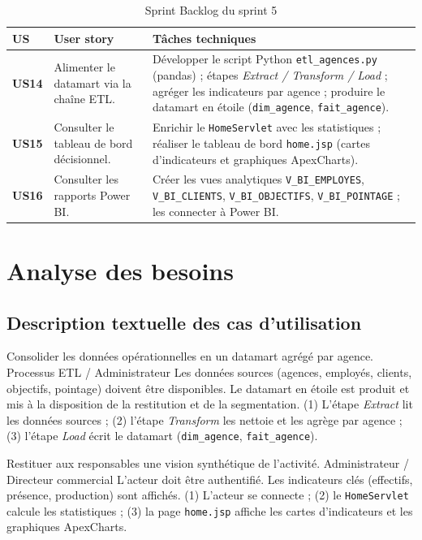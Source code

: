 \begin{table}[htbp]
\centering
\caption{Sprint Backlog du sprint 5}
\label{tab:bl_s5}
\renewcommand{\arraystretch}{1.3}
\begin{tabularx}{\textwidth}{>{\bfseries}p{1cm}p{5cm}X}
\toprule
\textmd{\textbf{US}} & \textbf{User story} & \textbf{Tâches techniques}\\
\midrule
US14 & Alimenter le datamart via la chaîne ETL. &
Développer le script Python \texttt{etl\_agences.py} (pandas) ; étapes
\emph{Extract / Transform / Load} ; agréger les indicateurs par agence ; produire
le datamart en étoile (\texttt{dim\_agence}, \texttt{fait\_agence}).\\
\midrule
US15 & Consulter le tableau de bord décisionnel. &
Enrichir le \texttt{HomeServlet} avec les statistiques ; réaliser le tableau de
bord \texttt{home.jsp} (cartes d'indicateurs et graphiques ApexCharts).\\
\midrule
US16 & Consulter les rapports Power BI. &
Créer les vues analytiques \texttt{V\_BI\_EMPLOYES}, \texttt{V\_BI\_CLIENTS},
\texttt{V\_BI\_OBJECTIFS}, \texttt{V\_BI\_POINTAGE} ; les connecter à Power BI.\\
\bottomrule
\end{tabularx}
\end{table}

\section{Analyse des besoins}

\subsection{Description textuelle des cas d'utilisation}

{Consolider les données opérationnelles en un datamart agrégé par agence.}
{Processus ETL / Administrateur}
{Les données sources (agences, employés, clients, objectifs, pointage) doivent
être disponibles.}
{Le datamart en étoile est produit et mis à la disposition de la restitution et de
la segmentation.}
{(1) L'étape \emph{Extract} lit les données sources ; (2) l'étape \emph{Transform}
les nettoie et les agrège par agence ; (3) l'étape \emph{Load} écrit le datamart
(\texttt{dim\_agence}, \texttt{fait\_agence}).}

{Restituer aux responsables une vision synthétique de l'activité.}
{Administrateur / Directeur commercial}
{L'acteur doit être authentifié.}
{Les indicateurs clés (effectifs, présence, production) sont affichés.}
{(1) L'acteur se connecte ; (2) le \texttt{HomeServlet} calcule les statistiques ;
(3) la page \texttt{home.jsp} affiche les cartes d'indicateurs et les graphiques
ApexCharts.}

